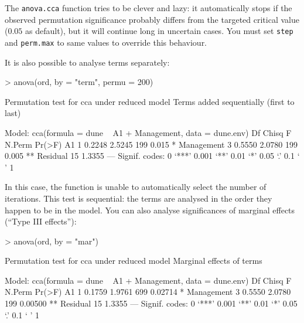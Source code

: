 \documentclass[a4paper,10pt]{amsart}
\begin{document}
The \texttt{anova.cca} function tries to be clever and lazy: it
automatically stops if the observed permutation significance probably
differs from the targeted critical value ($0.05$ as default), but it
will continue long in uncertain cases.  You must set \texttt{step} and
\texttt{perm.max} to same values to override this behaviour.

It is also possible to analyse terms separately:
\begin{Schunk}
\begin{Sinput}
> anova(ord, by = "term", permu = 200)
\end{Sinput}
\begin{Soutput}
Permutation test for cca under reduced model
Terms added sequentially (first to last)

Model: cca(formula = dune ~ A1 + Management, data = dune.env)
           Df  Chisq      F N.Perm Pr(>F)   
A1          1 0.2248 2.5245    199  0.015 * 
Management  3 0.5550 2.0780    199  0.005 **
Residual   15 1.3355                        
---
Signif. codes:  0 ‘***’ 0.001 ‘**’ 0.01 ‘*’ 0.05 ‘.’ 0.1 ‘ ’ 1 
\end{Soutput}
\end{Schunk}
In this case, the function is unable to automatically select the
number of iterations. This test is sequential: the terms are analysed
in the order they happen to be in the model. You can also analyse
significances of marginal effects (``Type III effects''):
\begin{Schunk}
\begin{Sinput}
> anova(ord, by = "mar")
\end{Sinput}
\begin{Soutput}
Permutation test for cca under reduced model
Marginal effects of terms

Model: cca(formula = dune ~ A1 + Management, data = dune.env)
           Df  Chisq      F N.Perm  Pr(>F)   
A1          1 0.1759 1.9761    699 0.02714 * 
Management  3 0.5550 2.0780    199 0.00500 **
Residual   15 1.3355                         
---
Signif. codes:  0 ‘***’ 0.001 ‘**’ 0.01 ‘*’ 0.05 ‘.’ 0.1 ‘ ’ 1 
\end{Soutput}
\end{Schunk}
\end{document}
